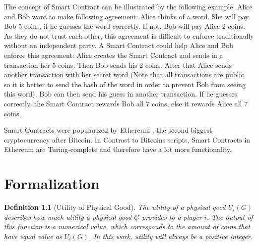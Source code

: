 \documentclass{cacthesis}
\newtheorem{definition}{Definition}
\begin{document}
The concept of Smart Contract can be illustrated by the following example: Alice and Bob want to make following agreement: Alice thinks of a word. She will pay Bob 5 coins, if he guesses the word correctly. If not, Bob will pay Alice 2 coins. As they do not trust each other, this agreement is difficult to enforce traditionally without an independent party. A Smart Contract could help Alice and Bob enforce this agreement: Alice creates the Smart Contract and sends in a transaction her 5 coins. Then Bob sends his 2 coins. After that Alice sends another transaction with her secret word (Note that all transactions are public, so it is better to send the hash of the word in order to prevent Bob from seeing this word). Bob can then send his guess in another transaction. If he guesses correctly, the Smart Contract rewards Bob all 7 coins, else it rewards Alice all 7 coins.\newline

Smart Contracts were popularized by Ethereum \cite{buterin_ethereum_nodate}, the second biggest cryptocurrency after Bitcoin. In Contrast to Bitcoins scripts, Smart Contracts in Ethereum are Turing-complete and therefore have a lot more functionality.
\chapter{Formalization}
\label{cha:formalizations}

\begin{definition}[Utility of Physical Good]
\label{def:utility-function}
The utility of a physical good $U_i(G)$ describes how much utility a physical good $G$ provides to a player $i$. The output of this function is a numerical value, which corresponds to the amount of coins that have equal value as $U_i(G)$. In this work, utility will always be a positive integer.
\end{definition}
\end{document}
